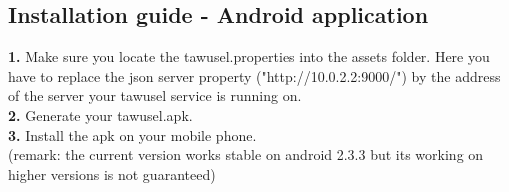 \subsection{Installation guide - Android application}\label{ssec:AndrInst}

\textbf{1.} Make sure you locate the tawusel.properties into the assets folder. Here you have to replace the json server
property ("http://10.0.2.2:9000/") by the address of the server your tawusel service is running on.\\
\textbf{2.} Generate your tawusel.apk.\\
\textbf{3.} Install the apk on your mobile phone.\\
(remark: the current version works stable on android 2.3.3 but its working on higher versions is not guaranteed)